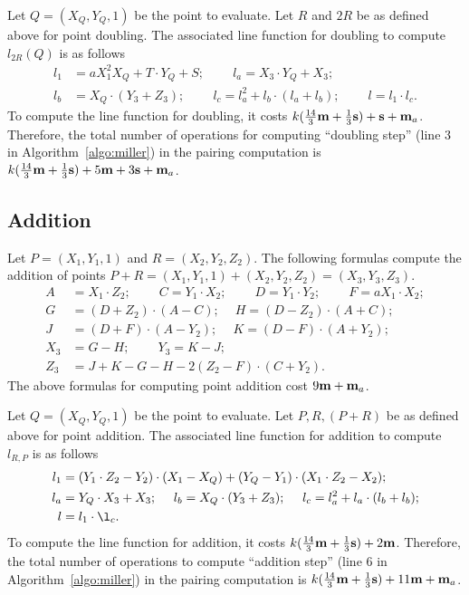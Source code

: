 Let $Q = (X_{Q}, Y_{Q}, 1)$ be the point to evaluate.
Let $R$ and $2R$ be as defined above for point doubling.
The associated line function for doubling
to compute $l_{2R}(Q)$ is as follows
\begin{align*}
l_1 &= a X_1^2 X_{Q} + T \cdot Y_{Q} + S;\		\qquad
l_a = X_3 \cdot Y_{Q} + X_3;			\\
l_b &= X_{Q} \cdot (Y_3 + Z_3);\			\qquad
l_c = l_a^2 + l_b \cdot (l_a + l_b);\		\qquad
l = l_1 \cdot l_c.
\end{align*}
To compute the line function for doubling,
it costs 
$k(\frac{14}{3}\textbf{m} + \frac{1}{3}\textbf{s}) + \textbf{s} + \textbf{m}_a$.
Therefore, the total number of operations for computing ``doubling step''
({line 3} in Algorithm~\ref{algo:miller}) in the pairing computation is
$k(\frac{14}{3}\textbf{m} + \frac{1}{3}\textbf{s}) + 5\textbf{m} +3\textbf{s} + \textbf{m}_a$.


\subsection{Addition}
Let $P = (X_1,Y_1,1)$ and $R = (X_2,Y_2,Z_2)$.
The following formulas compute the addition of points
$P + R = (X_1,Y_1,1) + (X_2,Y_2,Z_2) = (X_3,Y_3,Z_3)$.
\begin{align*}
A &= X_1 \cdot Z_2;\	\qquad
C = Y_1 \cdot X_2;\	\qquad
D = Y_1 \cdot Y_2;\	\qquad
F = a X_1 \cdot X_2;\\
G &= (D + Z_2) \cdot (A - C);\	\quad
H = (D - Z_2) \cdot (A + C);\\
J &= (D + F) \cdot (A - Y_2);\	\quad
K = (D - F) \cdot (A + Y_2);\\
X_3 &= G - H;\	\qquad
Y_3 = K - J;\\
Z_3 &= J + K - G - H - 2(Z_2 - F) \cdot (C + Y_2).
\end{align*}
The above formulas for computing point addition
cost $9\textbf{m} + \textbf{m}_{a}$.

Let $Q = (X_{Q},Y_{Q},1)$ be the point to evaluate.
Let $P,R,(P+R)$ be as defined above for point addition.
The associated line function for addition
to compute $l_{R,P}$ is as follows
\begin{align*}
l_1 &= (Y_1 \cdot Z_2 - Y_2) \cdot (X_1 - X_{Q}) + (Y_{Q} - Y_1) \cdot (X_1 \cdot Z_2 - X_2);\\
l_a &= Y_{Q} \cdot X_3 + X_3;\	\quad
l_b = X_{Q} \cdot (Y_3 + Z_3);\	\quad
l_c = l_a^2 + l_a \cdot (l_b + l_b);\\
l &= l_1 \cdot \l_c.
\end{align*}
To compute the line function for addition,
it costs
$k(\frac{14}{3}\textbf{m} + \frac{1}{3}\textbf{s}) + 2\textbf{m}$.
Therefore, the total number of operations to compute ``addition step''
({line 6} in Algorithm~\ref{algo:miller}) in the pairing computation is
$k(\frac{14}{3}\textbf{m} + \frac{1}{3}\textbf{s}) + 11\textbf{m} + \textbf{m}_a$.


